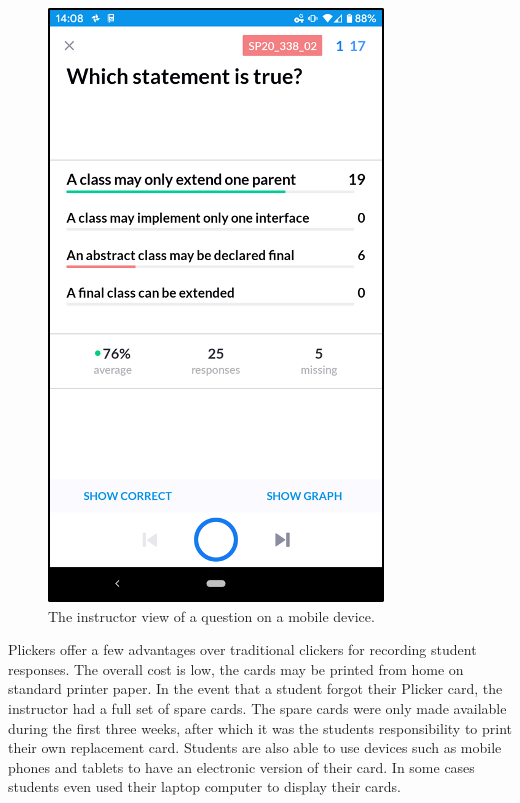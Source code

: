 \documentclass[12pt]{article}
\begin{document}
\begin{figure}[ht]
  \centering
  \includegraphics[]{instructor_view.png}
  \caption{The instructor view of a question on a mobile device.}
  \label{fig:plicker_instructor_view}
\end{figure}

Plickers offer a few advantages over traditional clickers for recording student responses. The overall cost is low, the cards may be printed from home on standard printer paper. In the event that a student forgot their Plicker card, the instructor had a full set of spare cards. The spare cards were only made available during the first three weeks, after which it was the students responsibility to print their own replacement card. Students are also able to use devices such as mobile phones and tablets to have an electronic version of their card.  In some cases students even used their laptop computer to display their cards.

\end{document}
